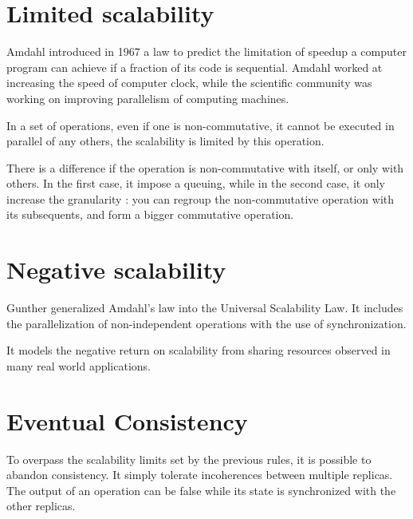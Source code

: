 
\section{Limited scalability}

Amdahl introduced in 1967 a law to predict the limitation of speedup a computer program can achieve if a fraction of its code is sequential.
Amdahl worked at increasing the speed of computer clock, while the scientific community was working on improving parallelism of computing machines.

In a set of operations, even if one is non-commutative, it cannot be executed in parallel of any others, the scalability is limited by this operation.

There is a difference if the operation is non-commutative with itself, or only with others.
In the first case, it impose a queuing, while in the second case, it only increase the granularity : you can regroup the non-commutative operation with its subsequents, and form a bigger commutative operation.


\section{Negative scalability}

Gunther generalized Amdahl's law into the Universal Scalability Law.
It includes the parallelization of non-independent operations with the use of synchronization.

It models the negative return on scalability from sharing resources observed in many real world applications.




\section{Eventual Consistency}

To overpass the scalability limits set by the previous rules, it is possible to abandon consistency.
It simply tolerate incoherences between multiple replicas.
The output of an operation can be false while its state is synchronized with the other replicas.



